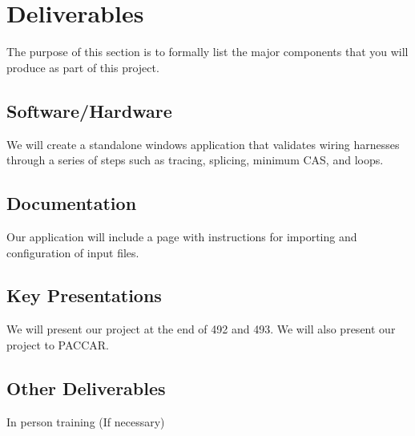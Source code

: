 \section{Deliverables}
 The purpose of this section is to formally list the major components that you
 will produce as part of this project.  

\subsection{Software/Hardware}
 We will create a standalone windows application that validates wiring harnesses
 through a series of steps such as tracing, splicing, minimum CAS, and loops.

\subsection{Documentation}
Our application will include a page with instructions for importing and configuration of
input files.

\subsection{Key Presentations}
 We will present our project at the end of 492 and 493.
 We will also present our project to PACCAR.

\subsection{Other Deliverables}
 In person training (If necessary)
